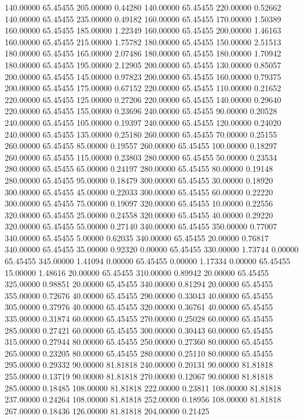 140.00000 65.45455 205.00000 0.44280
140.00000 65.45455 220.00000 0.52662
140.00000 65.45455 235.00000 0.49182
160.00000 65.45455 170.00000 1.50389
160.00000 65.45455 185.00000 1.22349
160.00000 65.45455 200.00000 1.46163
160.00000 65.45455 215.00000 1.75782
180.00000 65.45455 150.00000 2.51513
180.00000 65.45455 165.00000 2.07486
180.00000 65.45455 180.00000 1.70942
180.00000 65.45455 195.00000 2.12905
200.00000 65.45455 130.00000 0.85057
200.00000 65.45455 145.00000 0.97823
200.00000 65.45455 160.00000 0.79375
200.00000 65.45455 175.00000 0.67152
220.00000 65.45455 110.00000 0.21652
220.00000 65.45455 125.00000 0.27206
220.00000 65.45455 140.00000 0.29640
220.00000 65.45455 155.00000 0.23696
240.00000 65.45455 90.00000 0.20528
240.00000 65.45455 105.00000 0.19397
240.00000 65.45455 120.00000 0.24020
240.00000 65.45455 135.00000 0.25180
260.00000 65.45455 70.00000 0.25155
260.00000 65.45455 85.00000 0.19557
260.00000 65.45455 100.00000 0.18297
260.00000 65.45455 115.00000 0.23803
280.00000 65.45455 50.00000 0.23534
280.00000 65.45455 65.00000 0.24197
280.00000 65.45455 80.00000 0.19148
280.00000 65.45455 95.00000 0.18479
300.00000 65.45455 30.00000 0.18920
300.00000 65.45455 45.00000 0.22033
300.00000 65.45455 60.00000 0.22220
300.00000 65.45455 75.00000 0.19097
320.00000 65.45455 10.00000 0.22556
320.00000 65.45455 25.00000 0.24558
320.00000 65.45455 40.00000 0.29220
320.00000 65.45455 55.00000 0.27140
340.00000 65.45455 350.00000 0.77007
340.00000 65.45455 5.00000 0.62035
340.00000 65.45455 20.00000 0.76817
340.00000 65.45455 35.00000 0.92320
0.00000 65.45455 330.00000 1.73744
0.00000 65.45455 345.00000 1.41094
0.00000 65.45455 0.00000 1.17334
0.00000 65.45455 15.00000 1.48616
20.00000 65.45455 310.00000 0.89942
20.00000 65.45455 325.00000 0.98851
20.00000 65.45455 340.00000 0.81294
20.00000 65.45455 355.00000 0.72676
40.00000 65.45455 290.00000 0.33043
40.00000 65.45455 305.00000 0.37976
40.00000 65.45455 320.00000 0.36761
40.00000 65.45455 335.00000 0.31874
60.00000 65.45455 270.00000 0.25028
60.00000 65.45455 285.00000 0.27421
60.00000 65.45455 300.00000 0.30443
60.00000 65.45455 315.00000 0.27944
80.00000 65.45455 250.00000 0.27360
80.00000 65.45455 265.00000 0.23205
80.00000 65.45455 280.00000 0.25110
80.00000 65.45455 295.00000 0.29332
90.00000 81.81818 240.00000 0.20131
90.00000 81.81818 255.00000 0.13719
90.00000 81.81818 270.00000 0.12067
90.00000 81.81818 285.00000 0.18485
108.00000 81.81818 222.00000 0.23811
108.00000 81.81818 237.00000 0.24264
108.00000 81.81818 252.00000 0.18956
108.00000 81.81818 267.00000 0.18436
126.00000 81.81818 204.00000 0.21425
